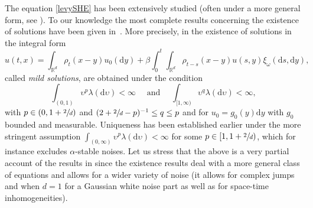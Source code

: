 \documentclass[JEP,XML,SOM,Unicode,published]{cedram}
\theoremstyle{definition}
\newcommand{\dd}{\mathrm{d}}
\newcommand{\bbR}{{\ensuremath{\mathbb R}} }
\let\ga\alpha
\let\gl\lambda
\let\ups\upsilon
\let\go\omega
\begin{document}
The equation \eqref{levySHE} has been extensively studied (often under a more general form, see \eg \cite{Mueller98, Loubert98}). To our knowledge the most complete results concerning the existence of solutions have been given in~\cite{Chong17}.
More precisely, in \cite{Chong17} the existence of solutions in the integral form
\begin{equation}\label{integralz}
u(t,x)= \int_{\bbR^d} \rho_{t}(x-y) u_0(\dd y) +\beta \int^t_0\int_{\bbR^d} \rho_{t-s}(x-y) u(s,y)
\xi_{\go}(\dd s, \dd y),
\end{equation}
called \textit{mild solutions},
are obtained under the condition
\begin{equation}\label{hypochong}
\int_{(0,1)} \ups^p \gl(\dd\ups)<\infty \quad \text{ and } \quad \int_{[1,\infty)} \ups^q \gl(\dd\ups)<\infty,
\end{equation}
with $p\in (0,1+\sfrac2d)$ and $ (2+\sfrac{2}{d}-p)^{-1} \le q\le p$ and for $u_0=g_0(y) \dd y$ with $g_0$ bounded and measurable.
Uniqueness has been established earlier \cite{Loubert98} under the more stringent assumption
$\int_{(0,\infty)} \ups^p \gl(\dd\ups)<\infty$ for some $p\in [1,1+\sfrac2d)$, which for instance excludes $\ga$-stable noises.
Let us stress that the above is a very partial account of the results in \cite{Chong17} since the existence results deal with a more general class of equations and allows for a wider variety of noise (it allows for complex jumps and when $d=1$ for a Gaussian white noise part as well as for space-time inhomogeneities).
\end{document}
